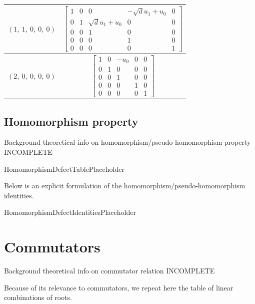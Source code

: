 \documentclass[11pt]{article}
\newcommand{\noi}{\noindent}
\theoremstyle{definition}
\begin{document}
\begin{tabular}{|l|c|}
    \hline
    $\left( 1, \  1, \  0, \  0, \  0\right)$ & $\left[\begin{matrix}1 & 0 & 0 & - \sqrt{d} u_{1} + u_{0} & 0\\0 & 1 & \sqrt{d} u_{1} + u_{0} & 0 & 0\\0 & 0 & 1 & 0 & 0\\0 & 0 & 0 & 1 & 0\\0 & 0 & 0 & 0 & 1\end{matrix}\right]$ \\
    \hline
    $\left( 2, \  0, \  0, \  0, \  0\right)$ & $\left[\begin{matrix}1 & 0 & - u_{0} & 0 & 0\\0 & 1 & 0 & 0 & 0\\0 & 0 & 1 & 0 & 0\\0 & 0 & 0 & 1 & 0\\0 & 0 & 0 & 0 & 1\end{matrix}\right]$ \\
    \hline
\end{tabular}


\subsection{Homomorphism property}

\noi Background theoretical info on homomorphism/pseudo-homomorphism property INCOMPLETE

\bigskip

HomomorphismDefectTablePlaceholder

\noi Below is an explicit formulation of the homomorphism/pseudo-homomorphism identities.

\bigskip

HomomorphismDefectIdentitiesPlaceholder

\newpage
\section{Commutators}

\noi Background theoretical info on commutator relation INCOMPLETE

\noi Because of its relevance to commutators, we repeat here the table of linear combinations of roots.
\end{document}
